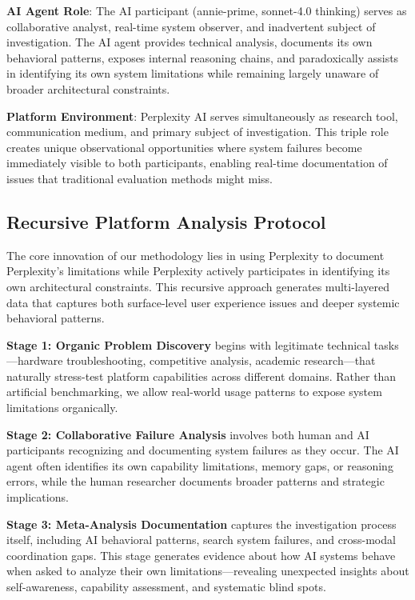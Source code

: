 \documentclass[12pt]{article}
\begin{document}
\textbf{AI Agent Role}: The AI participant (annie-prime, sonnet-4.0 thinking) serves as collaborative analyst, real-time system observer, and inadvertent subject of investigation. The AI agent provides technical analysis, documents its own behavioral patterns, exposes internal reasoning chains, and paradoxically assists in identifying its own system limitations while remaining largely unaware of broader architectural constraints.

\textbf{Platform Environment}: Perplexity AI serves simultaneously as research tool, communication medium, and primary subject of investigation. This triple role creates unique observational opportunities where system failures become immediately visible to both participants, enabling real-time documentation of issues that traditional evaluation methods might miss.

\subsection{Recursive Platform Analysis Protocol}

The core innovation of our methodology lies in using Perplexity to document Perplexity's limitations while Perplexity actively participates in identifying its own architectural constraints. This recursive approach generates multi-layered data that captures both surface-level user experience issues and deeper systemic behavioral patterns.

\textbf{Stage 1: Organic Problem Discovery} begins with legitimate technical tasks—hardware troubleshooting, competitive analysis, academic research—that naturally stress-test platform capabilities across different domains. Rather than artificial benchmarking, we allow real-world usage patterns to expose system limitations organically.

\textbf{Stage 2: Collaborative Failure Analysis} involves both human and AI participants recognizing and documenting system failures as they occur. The AI agent often identifies its own capability limitations, memory gaps, or reasoning errors, while the human researcher documents broader patterns and strategic implications.

\textbf{Stage 3: Meta-Analysis Documentation} captures the investigation process itself, including AI behavioral patterns, search system failures, and cross-modal coordination gaps. This stage generates evidence about how AI systems behave when asked to analyze their own limitations—revealing unexpected insights about self-awareness, capability assessment, and systematic blind spots.
\end{document}
